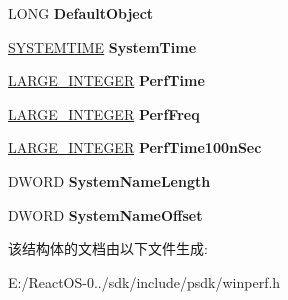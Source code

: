 \begin{DoxyCompactItemize}
L\+O\+NG {\bfseries Default\+Object}
\item 
\mbox{\label{struct___p_e_r_f___d_a_t_a___b_l_o_c_k_a625b0602dadce390be1152d7a517e287}} 
\hyperlink{struct___s_y_s_t_e_m_t_i_m_e}{S\+Y\+S\+T\+E\+M\+T\+I\+ME} {\bfseries System\+Time}
\item 
\mbox{\label{struct___p_e_r_f___d_a_t_a___b_l_o_c_k_a8abd55853280ae1fec4b969fe8db2b7c}} 
\hyperlink{union___l_a_r_g_e___i_n_t_e_g_e_r}{L\+A\+R\+G\+E\+\_\+\+I\+N\+T\+E\+G\+ER} {\bfseries Perf\+Time}
\item 
\mbox{\label{struct___p_e_r_f___d_a_t_a___b_l_o_c_k_a496442f29e68234faa750984d7e4fdc1}} 
\hyperlink{union___l_a_r_g_e___i_n_t_e_g_e_r}{L\+A\+R\+G\+E\+\_\+\+I\+N\+T\+E\+G\+ER} {\bfseries Perf\+Freq}
\item 
\mbox{\label{struct___p_e_r_f___d_a_t_a___b_l_o_c_k_a216e8015c089b96db829d75821ec0670}} 
\hyperlink{union___l_a_r_g_e___i_n_t_e_g_e_r}{L\+A\+R\+G\+E\+\_\+\+I\+N\+T\+E\+G\+ER} {\bfseries Perf\+Time100n\+Sec}
\item 
\mbox{\label{struct___p_e_r_f___d_a_t_a___b_l_o_c_k_a114bd6c8c6f35b32067cf7b64fec2f7a}} 
D\+W\+O\+RD {\bfseries System\+Name\+Length}
\item 
\mbox{\label{struct___p_e_r_f___d_a_t_a___b_l_o_c_k_abf08b50fc8db037dbb99287e0de0d6bf}} 
D\+W\+O\+RD {\bfseries System\+Name\+Offset}
\end{DoxyCompactItemize}


该结构体的文档由以下文件生成\+:\begin{DoxyCompactItemize}
\item 
E\+:/\+React\+O\+S-\/0../sdk/include/psdk/winperf.\+h\end{DoxyCompactItemize}
